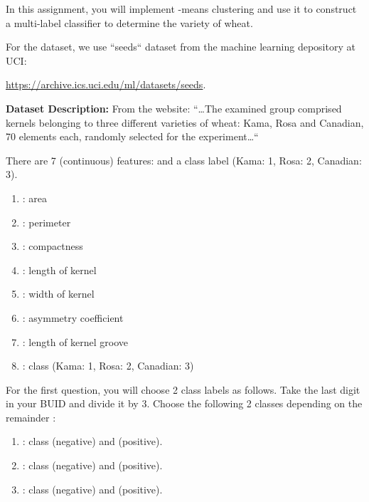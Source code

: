 \documentclass[../../main.tex]{subfiles}
\begin{document}
    In this assignment, you will implement -means clustering and use it to
    construct a multi-label classifier to determine the variety of wheat.

    For the dataset, we use ``seeds`` dataset from the machine learning depository at UCI: \par
    \url{https://archive.ics.uci.edu/ml/datasets/seeds}.

    \textbf{Dataset Description: } From the website: ``\dots The examined group
    comprised kernels belonging to three different varieties of wheat: Kama,
    Rosa and Canadian, 70 elements each, randomly selected for the experiment\dots``

    There are 7 (continuous) features:  and a class label
     (Kama: 1, Rosa: 2, Canadian: 3).

    \begin{enumerate}
        \item {}: area 
        \item {}: perimeter 
        \item {}: compactness 
        \item {}: length of kernel
        \item {}: width of kernel
        \item {}: asymmetry coefficient
        \item {}: length of kernel groove
        \item {}: class (Kama: 1, Rosa: 2, Canadian: 3)
    \end{enumerate}

    For the first question, you will choose 2 class labels as follows.
    Take the last digit in your BUID and divide it by 3.
    Choose the following 2 classes depending on the remainder :

    \begin{enumerate}
        \item {}: class  (negative) and  (positive).
        \item {}: class  (negative) and  (positive).
        \item {}: class  (negative) and  (positive).
    \end{enumerate}

    \newpage
\end{document}
